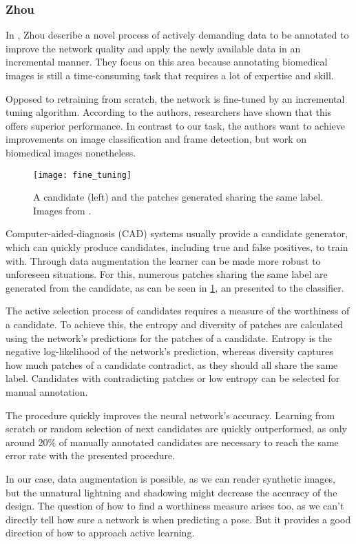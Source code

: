 \subsubsection{Zhou \etal}

In \cite{zhou}, Zhou \etal describe a novel process of actively demanding data to be annotated to improve the network quality and apply the newly available data in an incremental manner. They focus on this area because annotating biomedical images is still a time-consuming task that requires a lot of expertise and skill.

Opposed to retraining from scratch, the network is fine-tuned by an incremental tuning algorithm. According to the authors, researchers have shown that this offers superior performance. In contrast to our task, the authors want to achieve improvements on image classification and frame detection, but work on biomedical images nonetheless.

\begin{figure}[!tbp]
	\centering
    \texttt{[image: fine\_tuning]}
	\caption{A candidate (left) and the patches generated sharing the same label. Images from \cite{zhou}.}
	\label{fig:zhou}
\end{figure}
Computer-aided-diagnosis (CAD) systems usually provide a candidate generator, which can quickly produce candidates, including true and false positives, to train with. Through data augmentation the learner can be made more robust to unforeseen situations. For this, numerous patches sharing the same label are generated from the candidate, as can be seen in \fig \ref{fig:zhou}, an presented to the classifier. 


The active selection process of candidates requires a measure of the worthiness of a candidate. To achieve this, the entropy and diversity of patches are calculated using the network's predictions for the patches of a candidate. Entropy is the negative log-likelihood of the network's prediction, whereas diversity captures how much patches of a candidate contradict, as they should all share the same label. Candidates with contradicting patches or low entropy can be selected for manual annotation.

The procedure quickly improves the neural network's accuracy. Learning from scratch or random selection of next candidates are quickly  outperformed, as only around 20\% of manually annotated candidates are necessary to reach the same error rate with the presented procedure.

In our case, data augmentation is possible, as we can render synthetic images, but the unnatural lightning and shadowing might decrease the accuracy of the design. The question of how to find  a worthiness measure arises too, as we can't directly tell how sure a network is when predicting a pose. But it provides a good direction of how to approach active learning.

